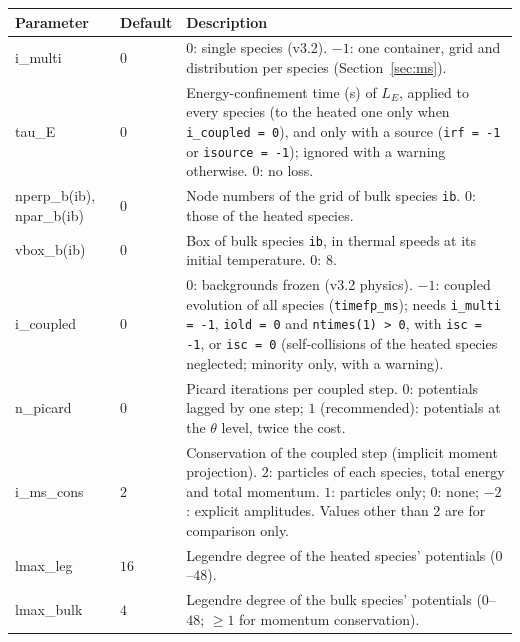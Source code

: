 \documentclass[11pt,a4paper]{article}
\begin{document}
\begin{longtable}{>{\ttfamily}p{3.2cm} p{1.5cm} p{9cm}}
\toprule
\normalfont Parameter & Default & Description \\
\midrule
\endhead
\bottomrule
\endlastfoot

i\_multi & $0$ &
  $0$: single species (v3.2).  $-1$: one container, grid and distribution per species
  (Section~\ref{sec:ms}). \\[4pt]

tau\_E & $0$ &
  Energy-confinement time (s) of $L_E$, applied to every species (to the heated one only when
  \texttt{i\_coupled = 0}), and only with a source (\texttt{irf = -1} or \texttt{isource = -1});
  ignored with a warning otherwise.  $0$: no loss. \\[4pt]

nperp\_b(ib), npar\_b(ib) & $0$ &
  Node numbers of the grid of bulk species \texttt{ib}.  $0$: those of the heated species. \\[4pt]

vbox\_b(ib) & $0$ &
  Box of bulk species \texttt{ib}, in thermal speeds at its initial temperature.  $0$: 8. \\[4pt]

i\_coupled & $0$ &
  $0$: backgrounds frozen (v3.2 physics).  $-1$: coupled evolution of all species
  (\texttt{timefp\_ms}); needs \texttt{i\_multi = -1}, \texttt{iold = 0} and
  \texttt{ntimes(1) > 0}, with \texttt{isc = -1}, or \texttt{isc = 0} (self-collisions of the
  heated species neglected; minority only, with a warning). \\[4pt]

n\_picard & $0$ &
  Picard iterations per coupled step.  $0$: potentials lagged by one step; $1$ (recommended):
  potentials at the $\theta$ level, twice the cost. \\[4pt]

i\_ms\_cons & $2$ &
  Conservation of the coupled step (implicit moment projection).  $2$: particles of each species,
  total energy and total momentum.  $1$: particles only; $0$: none; $-2$: explicit amplitudes.
  Values other than 2 are for comparison only. \\[4pt]

lmax\_leg & $16$ &
  Legendre degree of the heated species' potentials ($0$--$48$). \\[4pt]

lmax\_bulk & $4$ &
  Legendre degree of the bulk species' potentials ($0$--$48$; $\ge1$ for momentum
  conservation). \\[4pt]


\end{longtable}
\end{document}
